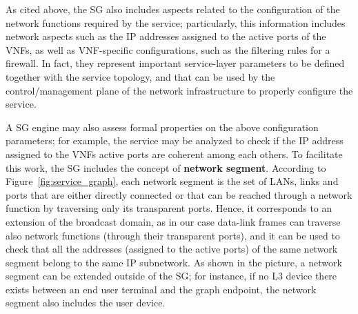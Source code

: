 As cited above, the SG also includes aspects related to the configuration of the network functions required by the service;
particularly, this information includes network aspects such as the IP addresses assigned to the active ports of the VNFs, as well as VNF-specific configurations, such as the filtering rules for a firewall.
In fact, they represent important service-layer parameters to be defined together with the service topology, %
and that can be used by the control/management plane of the network infrastructure to properly configure the service.

A SG engine may also assess formal properties on the above configuration parameters; for example, the service may  be analyzed %
to check if the IP address assigned to the VNFs active ports are coherent among each others.
To facilitate this work, the SG includes the concept of \textbf{network segment}. 
According to Figure~\ref{fig:service_graph}, each network segment is the set of LANs, links and ports that are either directly connected or that can be reached through a network function by traversing only its transparent ports. 
Hence, it corresponds to an extension of the broadcast domain, as in our case data-link frames can traverse also network functions (through their transparent ports), and it can be used to check that all the addresses (assigned to the active ports) of the same network segment belong to the same IP subnetwork.
As shown in the picture, a network segment can be extended outside of the SG; for instance, if no L3 device there exists between an end user terminal and the graph endpoint, the network segment also includes the user device.





